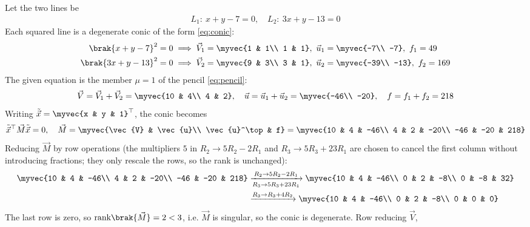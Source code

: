 \begin{enumerate}[label=\thesubsection.\arabic*, ref=\thesubsection.\theenumi, itemsep=0pt, leftmargin=*]
\solution Let the two lines be
\begin{align}
L_1:\ x + y - 7 = 0,\quad L_2:\ 3x + y - 13 = 0
\end{align}
Each squared line is a degenerate conic of the form \eqref{eq:conic}:
\begin{align}
\brak{x + y - 7}^2 = 0 &\implies \vec{V}_1 = \myvec{1 & 1\\ 1 & 1},\ \vec{u}_1 = \myvec{-7\\ -7},\ f_1 = 49\\
\brak{3x + y - 13}^2 = 0 &\implies \vec{V}_2 = \myvec{9 & 3\\ 3 & 1},\ \vec{u}_2 = \myvec{-39\\ -13},\ f_2 = 169
\end{align}
The given equation is the member $\mu = 1$ of the pencil \eqref{eq:pencil}:
\begin{align}
\vec{V} = \vec{V}_1 + \vec{V}_2 = \myvec{10 & 4\\ 4 & 2},\quad \vec{u} = \vec{u}_1 + \vec{u}_2 = \myvec{-46\\ -20},\quad f = f_1 + f_2 = 218
\end{align}
Writing $\tilde{\vec{x}} = \myvec{x & y & 1}^\top$, the conic becomes
\begin{align}
\tilde{\vec{x}}^\top\vec{M}\tilde{\vec{x}} = 0,\quad \vec{M} = \myvec{\vec{V} & \vec{u}\\ \vec{u}^\top & f} = \myvec{10 & 4 & -46\\ 4 & 2 & -20\\ -46 & -20 & 218}
\end{align}
Reducing $\vec{M}$ by row operations (the multipliers $5$ in $R_2\to 5R_2 - 2R_1$ and $R_3\to 5R_3 + 23R_1$ are chosen to cancel the first column without introducing fractions; they only rescale the rows, so the rank is unchanged):
\begin{align}
\myvec{10 & 4 & -46\\ 4 & 2 & -20\\ -46 & -20 & 218}
&\xrightarrow[R_3\to 5R_3 + 23R_1]{R_2\to 5R_2 - 2R_1}
\myvec{10 & 4 & -46\\ 0 & 2 & -8\\ 0 & -8 & 32}\\
&\xrightarrow{R_3\to R_3 + 4R_2}
\myvec{10 & 4 & -46\\ 0 & 2 & -8\\ 0 & 0 & 0}
\end{align}
The last row is zero, so $\text{rank}\brak{\vec{M}} = 2 < 3$, i.e. $\vec{M}$ is singular, so the conic is degenerate. Row reducing $\vec{V}$,

\end{enumerate}
